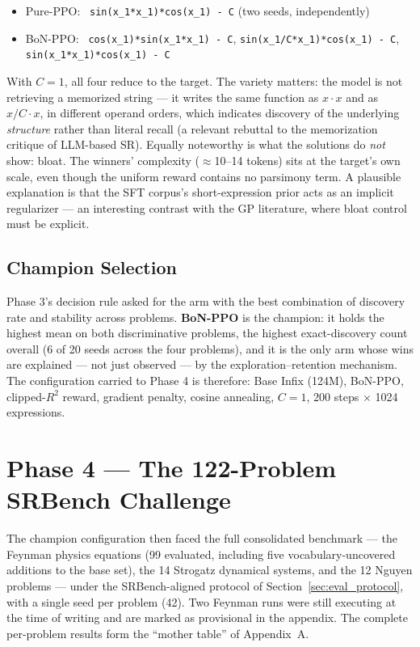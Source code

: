 \begin{itemize}
    \item Pure-PPO: \ \texttt{sin(x\_1*x\_1)*cos(x\_1) - C} \quad (two seeds, independently)
    \item BoN-PPO: \ \texttt{cos(x\_1)*sin(x\_1*x\_1) - C}, \quad \texttt{sin(x\_1/C*x\_1)*cos(x\_1) - C}, \\ \hspace*{1.55cm}\texttt{sin(x\_1*x\_1)*cos(x\_1) - C}
\end{itemize}

With $C=1$, all four reduce to the target. The variety matters: the model is not retrieving a memorized string --- it writes the same function as $x \cdot x$ and as $x/C \cdot x$, in different operand orders, which indicates discovery of the underlying \emph{structure} rather than literal recall (a relevant rebuttal to the memorization critique of LLM-based SR). Equally noteworthy is what the solutions do \emph{not} show: bloat. The winners' complexity ($\approx$10--14 tokens) sits at the target's own scale, even though the uniform reward contains no parsimony term. A plausible explanation is that the SFT corpus's short-expression prior acts as an implicit regularizer --- an interesting contrast with the GP literature, where bloat control must be explicit.

\subsection{Champion Selection}

Phase 3's decision rule asked for the arm with the best combination of discovery rate and stability across problems. \textbf{BoN-PPO} is the champion: it holds the highest mean on both discriminative problems, the highest exact-discovery count overall (6 of 20 seeds across the four problems), and it is the only arm whose wins are explained --- not just observed --- by the exploration--retention mechanism. The configuration carried to Phase 4 is therefore: Base Infix (124M), BoN-PPO, clipped-$R^2$ reward, gradient penalty, cosine annealing, $C=1$, 200 steps $\times$ 1024 expressions.

\section{Phase 4 --- The 122-Problem SRBench Challenge}
\label{sec:phase4_results}

The champion configuration then faced the full consolidated benchmark --- the Feynman physics equations (99 evaluated, including five vocabulary-uncovered additions to the base set), the 14 Strogatz dynamical systems, and the 12 Nguyen problems --- under the SRBench-aligned protocol of Section~\ref{sec:eval_protocol}, with a single seed per problem (42). Two Feynman runs were still executing at the time of writing and are marked as provisional in the appendix. The complete per-problem results form the ``mother table'' of Appendix~A.

